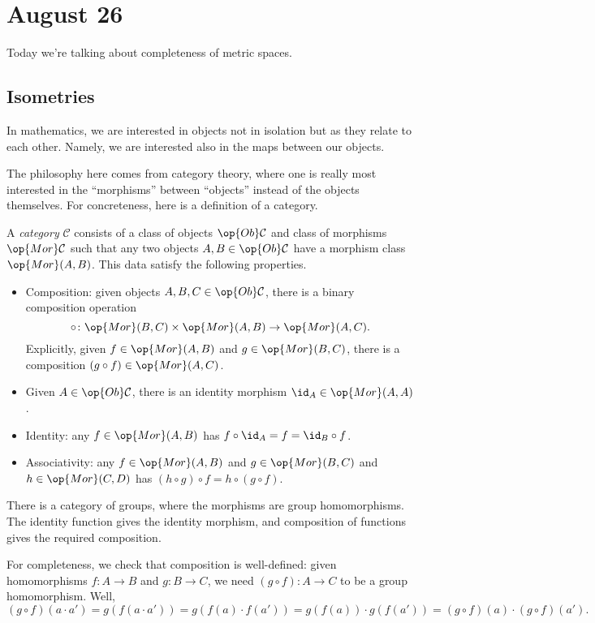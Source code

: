 \documentclass[../notes.tex]{subfiles}
\begin{document}
\section{August 26}

Today we're talking about completeness of metric spaces.

\subsection{Isometries}
In mathematics, we are interested in objects not in isolation but as they relate to each other. Namely, we are interested also in the maps between our objects.

The philosophy here comes from category theory, where one is really most interested in the ``morphisms'' between ``objects'' instead of the objects themselves. For concreteness, here is a definition of a category.
\begin{definition}[Category]
	A \textit{category} $\mathcal C$ consists of a class of objects $\op{Ob}\mathcal C$ and class of morphisms $\op{Mor}\mathcal C$ such that any two objects $A,B\in\op{Ob}\mathcal C$ have a morphism class $\op{Mor}(A,B)$. This data satisfy the following properties.
	\begin{itemize}
		\item Composition: given objects $A,B,C\in\op{Ob}\mathcal C$, there is a binary composition operation
		\[\circ\colon\op{Mor}(B,C)\times\op{Mor}(A,B)\to\op{Mor}(A,C).\]
		Explicitly, given $f\in\op{Mor}(A,B)$ and $g\in\op{Mor}(B,C)$, there is a composition $(g\circ f)\in\op{Mor}(A,C)$.
		\item Given $A\in\op{Ob}\mathcal C$, there is an identity morphism ${\id_A}\in\op{Mor}(A,A)$.
		\item Identity: any $f\in\op{Mor}(A,B)$ has $f\circ{\id_A}=f={\id_B}\circ f$.
		\item Associativity: any $f\in\op{Mor}(A,B)$ and $g\in\op{Mor}(B,C)$ and $h\in\op{Mor}(C,D)$ has $(h\circ g)\circ f=h\circ (g\circ f)$.
	\end{itemize}
\end{definition}
\begin{example}
	There is a category of groups, where the morphisms are group homomorphisms. The identity function gives the identity morphism, and composition of functions gives the required composition.
	
	For completeness, we check that composition is well-defined: given homomorphisms $f\colon A\to B$ and $g\colon B\to C$, we need $(g\circ f)\colon A\to C$ to be a group homomorphism. Well,
	\[(g\circ f)(a\cdot a')=g(f(a\cdot a'))=g(f(a)\cdot f(a'))=g(f(a))\cdot g(f(a'))=(g\circ f)(a)\cdot (g\circ f)(a').\]
\end{example}
\end{document}
